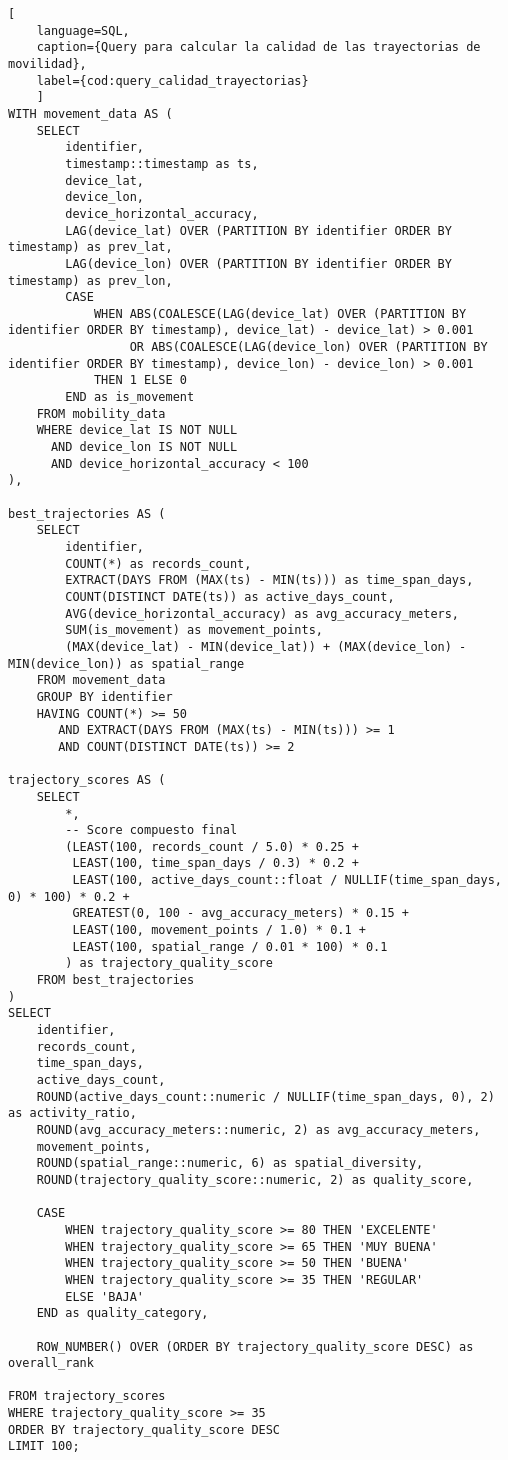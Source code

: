 \begin{lstlisting}[
    language=SQL,
    caption={Query para calcular la calidad de las trayectorias de movilidad},
    label={cod:query_calidad_trayectorias}
    ]
WITH movement_data AS (
    SELECT 
        identifier,
        timestamp::timestamp as ts,
        device_lat,
        device_lon,
        device_horizontal_accuracy,
        LAG(device_lat) OVER (PARTITION BY identifier ORDER BY timestamp) as prev_lat,
        LAG(device_lon) OVER (PARTITION BY identifier ORDER BY timestamp) as prev_lon,
        CASE 
            WHEN ABS(COALESCE(LAG(device_lat) OVER (PARTITION BY identifier ORDER BY timestamp), device_lat) - device_lat) > 0.001 
                 OR ABS(COALESCE(LAG(device_lon) OVER (PARTITION BY identifier ORDER BY timestamp), device_lon) - device_lon) > 0.001 
            THEN 1 ELSE 0 
        END as is_movement
    FROM mobility_data
    WHERE device_lat IS NOT NULL 
      AND device_lon IS NOT NULL
      AND device_horizontal_accuracy < 100
),

best_trajectories AS (
    SELECT 
        identifier,
        COUNT(*) as records_count,
        EXTRACT(DAYS FROM (MAX(ts) - MIN(ts))) as time_span_days,
        COUNT(DISTINCT DATE(ts)) as active_days_count,
        AVG(device_horizontal_accuracy) as avg_accuracy_meters,
        SUM(is_movement) as movement_points,
        (MAX(device_lat) - MIN(device_lat)) + (MAX(device_lon) - MIN(device_lon)) as spatial_range
    FROM movement_data
    GROUP BY identifier
    HAVING COUNT(*) >= 50  
       AND EXTRACT(DAYS FROM (MAX(ts) - MIN(ts))) >= 1  
       AND COUNT(DISTINCT DATE(ts)) >= 2 

trajectory_scores AS (
    SELECT 
        *,
        -- Score compuesto final
        (LEAST(100, records_count / 5.0) * 0.25 +  
         LEAST(100, time_span_days / 0.3) * 0.2 + 
         LEAST(100, active_days_count::float / NULLIF(time_span_days, 0) * 100) * 0.2 +  
         GREATEST(0, 100 - avg_accuracy_meters) * 0.15 +  
         LEAST(100, movement_points / 1.0) * 0.1 +  
         LEAST(100, spatial_range / 0.01 * 100) * 0.1  
        ) as trajectory_quality_score
    FROM best_trajectories
)
SELECT 
    identifier,
    records_count,
    time_span_days,
    active_days_count,
    ROUND(active_days_count::numeric / NULLIF(time_span_days, 0), 2) as activity_ratio,
    ROUND(avg_accuracy_meters::numeric, 2) as avg_accuracy_meters,
    movement_points,
    ROUND(spatial_range::numeric, 6) as spatial_diversity,
    ROUND(trajectory_quality_score::numeric, 2) as quality_score,
    
    CASE 
        WHEN trajectory_quality_score >= 80 THEN 'EXCELENTE'
        WHEN trajectory_quality_score >= 65 THEN 'MUY BUENA'
        WHEN trajectory_quality_score >= 50 THEN 'BUENA'
        WHEN trajectory_quality_score >= 35 THEN 'REGULAR'
        ELSE 'BAJA'
    END as quality_category,
    
    ROW_NUMBER() OVER (ORDER BY trajectory_quality_score DESC) as overall_rank

FROM trajectory_scores
WHERE trajectory_quality_score >= 35  
ORDER BY trajectory_quality_score DESC
LIMIT 100;  
\end{lstlisting}
\vfill

